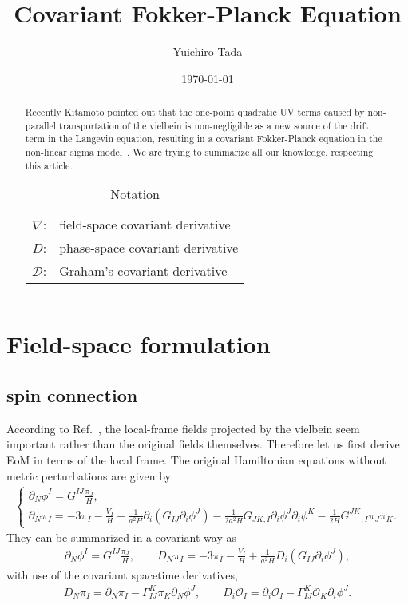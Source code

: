 \documentclass[aps, prd
, preprint
, nofootinbib 
, notitlepage
, longbibliography
]{revtex4-1}
\newcommand{\dps}{\displaystyle}
\newcommand{\calD}{\mathcal{D}}
\newcommand{\calO}{\mathcal{O}}
\newcommand{\bae}[1]{\begin{align} #1 \end{align}}
\newcommand{\bce}[1]{\begin{cases} #1 \end{cases}}
\begin{document}
\title{Covariant Fokker-Planck Equation}
\date{\today}

\author{Yuichiro Tada}


\begin{abstract}
Recently Kitamoto pointed out that the one-point quadratic UV terms caused by non-parallel transportation of the vielbein is non-negligible as a new source of the drift term in the Langevin equation,
resulting in a covariant Fokker-Planck equation in the non-linear sigma model~\cite{Kitamoto:2018dek}.
We are trying to summarize all our knowledge, respecting this article.
\begin{table}[htbp]
	\centering
	\caption{Notation}
	\begin{tabular}{rl}
		$\nabla$: & field-space covariant derivative \\
		$D$: & phase-space covariant derivative \\
		$\calD$: & Graham's covariant derivative
	\end{tabular}
\end{table}
\end{abstract}

\maketitle


\section{Field-space formulation}

\subsection{spin connection}

According to Ref.~\cite{Kitamoto:2018dek}, the local-frame fields projected by the vielbein seem
important rather than the original fields themselves. Therefore let us first derive EoM in terms of the local frame.
The original Hamiltonian equations without metric perturbations are given by
\bae{
    \bce{
        \dps
        \partial_N\phi^I=G^{IJ}\frac{\pi_J}{H}, \\
        \dps
        \partial_N\pi_I=-3\pi_I-\frac{V_I}{H}+\frac{1}{a^2H}\partial_i\left(G_{IJ}\partial_i\phi^J\right)
        -\frac{1}{2a^2H}G_{JK,I}\partial_i\phi^J\partial_i\phi^K-\frac{1}{2H}G^{JK}{}_{,I}\pi_J\pi_K.
    }
}
They can be summarized in a covariant way as
\bae{
    \partial_N\phi^I=G^{IJ}\frac{\pi_J}{H}, \qquad D_N\pi_I=-3\pi_I-\frac{V_I}{H}+\frac{1}{a^2H}D_i\left(G_{IJ}\partial_i\phi^J\right),
}
with use of the covariant spacetime derivatives,
\bae{
    D_N\pi_I=\partial_N\pi_I-\Gamma^K_{IJ}\pi_K\partial_N\phi^J, \qquad 
    D_i\calO_I=\partial_i\calO_I-\Gamma^K_{IJ}\calO_K\partial_i\phi^J.
} 
\end{document}

